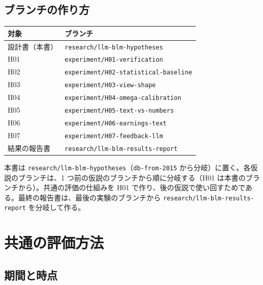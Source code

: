 \documentclass[xelatex,ja=standard,jafont=haranoaji,a4paper,10pt,openany]{bxjsreport}
\newcommand{\code}[1]{\texttt{#1}}
\begin{document}
\section{ブランチの作り方}

\begin{center}
\small
\begin{tabular}{ll}
\toprule
対象 & ブランチ \\
\midrule
設計書（本書） & \code{research/llm-blm-hypotheses} \\
H01 & \code{experiment/H01-verification} \\
H02 & \code{experiment/H02-statistical-baseline} \\
H03 & \code{experiment/H03-view-shape} \\
H04 & \code{experiment/H04-omega-calibration} \\
H05 & \code{experiment/H05-text-vs-numbers} \\
H06 & \code{experiment/H06-earnings-text} \\
H07 & \code{experiment/H07-feedback-llm} \\
結果の報告書 & \code{research/llm-blm-results-report} \\
\bottomrule
\end{tabular}
\end{center}

本書は \code{research/llm-blm-hypotheses}（\code{db-from-2015} から分岐）に置く。各仮説のブランチは、1 つ前の仮説のブランチから順に分岐する（H01 は本書のブランチから）。共通の評価の仕組みを H01 で作り、後の仮説で使い回すためである。最終の報告書は、最後の実験のブランチから \code{research/llm-blm-results-report} を分岐して作る。

\chapter{共通の評価方法}\label{ch:eval}

\section{期間と時点}
\end{document}
